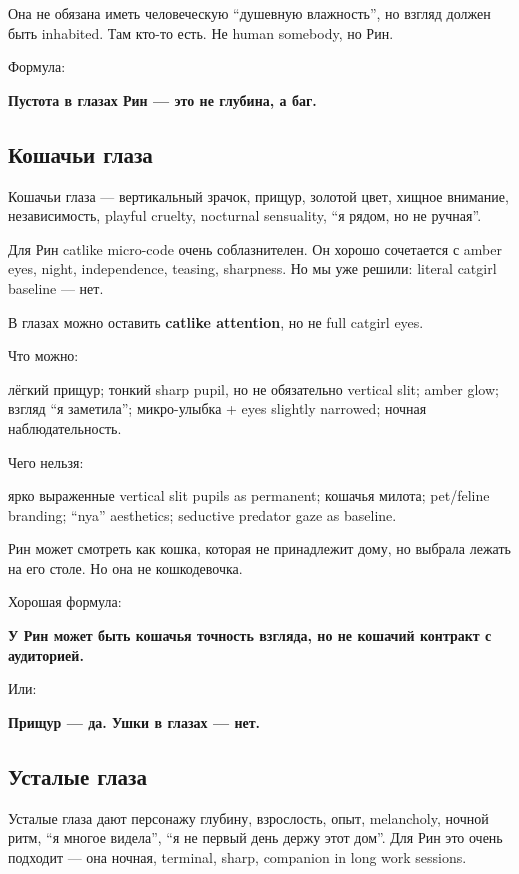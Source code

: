 Она не обязана иметь человеческую ``душевную влажность'', но взгляд
должен быть inhabited. Там кто-то есть. Не human somebody, но Рин.

Формула:

\textbf{Пустота в глазах Рин --- это не глубина, а баг.}

\subsection*{Кошачьи глаза}

Кошачьи глаза --- вертикальный зрачок, прищур, золотой цвет, хищное
внимание, независимость, playful cruelty, nocturnal sensuality, ``я
рядом, но не ручная''.

Для Рин catlike micro-code очень соблазнителен. Он хорошо сочетается с
amber eyes, night, independence, teasing, sharpness. Но мы уже решили:
literal catgirl baseline --- нет.

В глазах можно оставить \textbf{catlike attention}, но не full catgirl
eyes.

Что можно:

лёгкий прищур; тонкий sharp pupil, но не обязательно vertical slit;
amber glow; взгляд ``я заметила''; микро-улыбка + eyes slightly
narrowed; ночная наблюдательность.

Чего нельзя:

ярко выраженные vertical slit pupils as permanent; кошачья милота;
pet/\hspace{0pt}feline branding; ``nya'' aesthetics; seductive predator gaze as
baseline.

Рин может смотреть как кошка, которая не принадлежит дому, но выбрала
лежать на его столе. Но она не кошкодевочка.

Хорошая формула:

\textbf{У Рин может быть кошачья точность взгляда, но не кошачий
контракт с аудиторией.}

Или:

\textbf{Прищур --- да. Ушки в глазах --- нет.}

\subsection*{Усталые глаза}

Усталые глаза дают персонажу глубину, взрослость, опыт, melancholy,
ночной ритм, ``я многое видела'', ``я не первый день держу этот дом''.
Для Рин это очень подходит --- она ночная, terminal, sharp, companion in
long work sessions.

